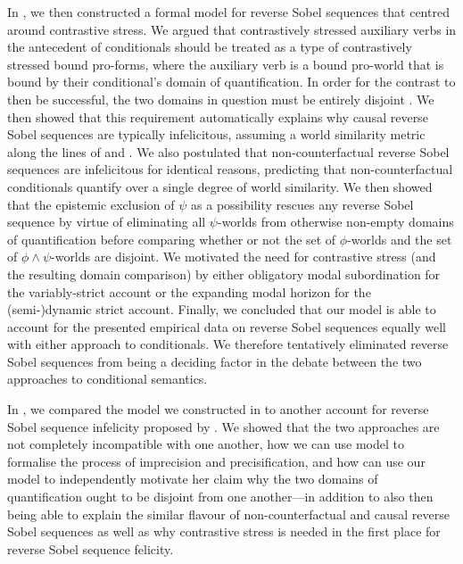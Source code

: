 In , we then constructed a formal model for reverse Sobel sequences that centred around contrastive stress. We argued that contrastively stressed auxiliary verbs in the antecedent of conditionals should be treated as a type of contrastively stressed bound pro-forms, where the auxiliary verb is a bound pro-world that is bound by their conditional's domain of quantification. In order for the contrast to then be successful, the two domains in question must be entirely disjoint \parencite{Sauerland1998,Sauerland1999,Sauerland2000,Jacobson2000,Jacobson2004,Mayr2012}. We then showed that this requirement automatically explains why causal reverse Sobel sequences are typically infelicitous, assuming a world similarity metric along the lines of \textcite{Bennett2003} and \textcite{Arregui2009}. We also postulated that non-counterfactual reverse Sobel sequences are infelicitous for identical reasons, predicting that non-counterfactual conditionals quantify over a single degree of world similarity. We then showed that the epistemic exclusion of $\psi$ as a possibility rescues any reverse Sobel sequence by virtue of eliminating all $\psi$-worlds from otherwise non-empty domains of quantification before comparing whether or not the set of $\phi$-worlds and the set of $\phi\land\psi$-worlds are disjoint. We motivated the need for contrastive stress (and the resulting domain comparison) by either obligatory modal subordination for the variably-strict account or the expanding modal horizon for the (semi-)dynamic strict account. Finally, we concluded that our model is able to account for the presented empirical data on reverse Sobel sequences equally well with either approach to conditionals. We therefore tentatively eliminated reverse Sobel sequences from being a deciding factor in the debate between the two approaches to conditional semantics.

In , we compared the model we constructed in  to another account for reverse Sobel sequence infelicity proposed by \textcite{Ippolito2020}. We showed that the two approaches are not completely incompatible with one another, how we can use  model to formalise the process of imprecision and precisification, and how \textcite{Ippolito2020} can use our model to independently motivate her claim why the two domains of quantification ought to be disjoint from one another---in addition to also then being able to explain the similar flavour of non-counterfactual and causal reverse Sobel sequences as well as why contrastive stress is needed in the first place for reverse Sobel sequence felicity.

